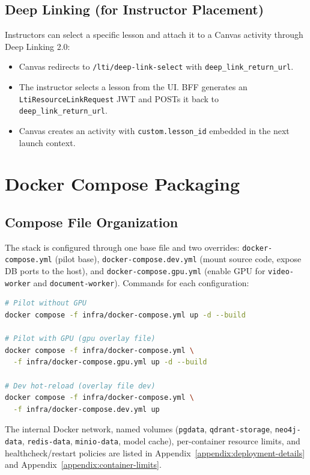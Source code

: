 \subsection{Deep Linking (for Instructor Placement)}

Instructors can select a specific lesson and attach it to a Canvas
activity through Deep Linking 2.0:

\begin{itemize}
    \item Canvas redirects to \texttt{/lti/deep-link-select} with
          \texttt{deep\_link\_return\_url}.
    \item The instructor selects a lesson from the UI. BFF generates an
          \texttt{LtiResourceLinkRequest} JWT and POSTs it back to
          \texttt{deep\_link\_return\_url}.
    \item Canvas creates an activity with \texttt{custom.lesson\_id}
          embedded in the next launch context.
\end{itemize}

\section{Docker Compose Packaging}
\label{sec:docker-compose}

\subsection{Compose File Organization}

The stack is configured through one base file and two overrides:
\texttt{docker-compose.yml} (pilot base), \texttt{docker-compose.dev.yml}
(mount source code, expose DB ports to the host), and
\texttt{docker-compose.gpu.yml} (enable GPU for \texttt{video-worker}
and \texttt{document-worker}). Commands for each configuration:

\begin{lstlisting}[language=bash, caption={Running the stack by configuration.}]
# Pilot without GPU
docker compose -f infra/docker-compose.yml up -d --build

# Pilot with GPU (gpu overlay file)
docker compose -f infra/docker-compose.yml \
  -f infra/docker-compose.gpu.yml up -d --build

# Dev hot-reload (overlay file dev)
docker compose -f infra/docker-compose.yml \
  -f infra/docker-compose.dev.yml up
\end{lstlisting}

The internal Docker network, named volumes (\texttt{pgdata},
\texttt{qdrant-storage}, \texttt{neo4j-data}, \texttt{redis-data},
\texttt{minio-data}, model cache), per-container resource limits, and
healthcheck/restart policies are listed in
Appendix~\ref{appendix:deployment-details} and
Appendix~\ref{appendix:container-limits}.

